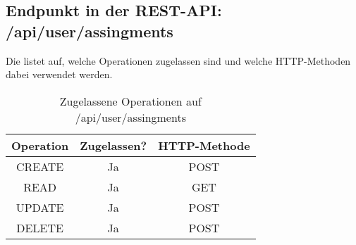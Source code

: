 \subsection{Endpunkt in der REST-API: /api/user/assingments}
Die  listet auf, welche Operationen zugelassen sind und welche HTTP-Methoden dabei verwendet werden. 

\begin{table}[!htbp]
	\begin{tabular}{|c|c|c|}
		\hline
			\textbf{Operation} & \textbf{Zugelassen?} & \textbf{HTTP-Methode} \\ \hline
			CREATE & Ja & POST \\ \hline 
			READ & Ja & GET \\ \hline
			UPDATE & Ja & POST \\ \hline 
			DELETE & Ja & POST \\ \hline
	\end{tabular}

		\caption{Zugelassene Operationen auf /api/user/assingments}
		\label{tab:end:rest:api:user:assingments:meth}
\end{table}

